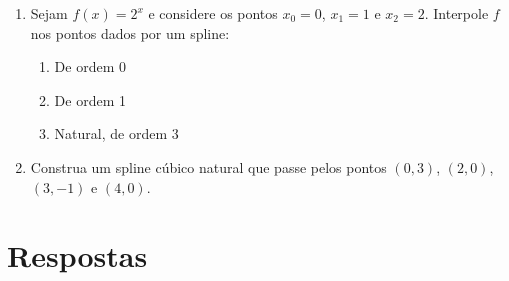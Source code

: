 \documentclass[12pt,a4paper]{article}
\begin{document}
\begin{enumerate}
\item Sejam $f(x) = 2^x$ e considere os pontos $x_0 = 0$, $x_1 = 1$ e $x_2 = 2$. Interpole $f$ nos pontos dados por um spline:
\begin{multicols}{3}
\begin{enumerate}
\item De ordem 0
\item De ordem 1
\item Natural, de ordem 3
\end{enumerate}
\end{multicols}
\item Construa um spline cúbico natural que passe pelos pontos $(0, 3)$, $(2, 0)$, $(3, -1)$ e $(4, 0)$.
\end{enumerate}


\newpage
\section*{Respostas}
\end{document}
